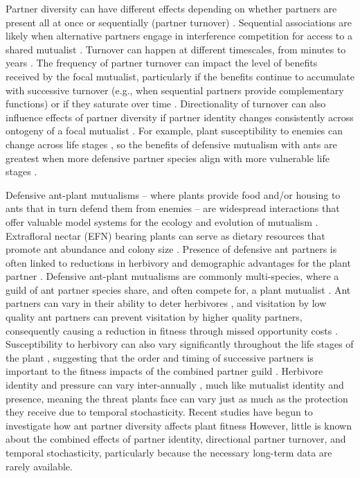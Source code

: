 \documentclass[11pt]{article}
\begin{document}
Partner diversity can have different effects depending on whether partners are present all at once or sequentially (partner turnover) \citep{Djieto-Lordon2005, Ness2006, Bruna2014,Barrett2015,Ushio2020,Dattilo2014}. 
Sequential associations are likely when alternative partners engage in interference competition for access to a shared mutualist \cite{Kiers2003,Batstone2018,Tgaard2015,Wulff2008}. 
Turnover can happen at different timescales, from minutes to years \citep{Oliveira1999,Horvitz1986}. 
The frequency of partner turnover can impact the level of benefits received by the focal mutualist, particularly if the benefits continue to accumulate with successive turnover (e.g., when sequential partners provide complementary functions) or if they saturate over time \citep{Sachs2004,Fiala1994}.
Directionality of turnover can also influence effects of partner diversity if partner identity changes consistently across ontogeny of a focal mutualist \citep{Fonseca2003,Noe1994,Dejean2008}.
For example, plant susceptibility to enemies can change across life stages \citep{Boege2005,Barton2010}, so the benefits of defensive mutualism with ants are greatest when more defensive partner species align with more vulnerable life stages \citep{Djieto-Lordon2005,Dejean2008}.

Defensive ant-plant mutualisms -- where plants provide food and/or housing to ants that in turn defend them from enemies -- are widespread interactions that offer valuable model systems for the ecology and evolution of mutualism \citep{Bronstein1998, Bronstein2006}. 
Extrafloral nectar (EFN) bearing plants can serve as dietary resources that promote ant abundance and colony size \citep{Byk2011, Ness2009, Ness2006, Donald2022}.
Presence of defensive ant partners is often linked to reductions in herbivory  \citep{Trager2010, Rudgers2004} and demographic advantages for the plant partner \citep{Baez2016}.
Defensive ant-plant mutualisms are commonly multi-species, where a guild of ant partner species share, and often compete for, a plant mutualist \citep{Bronstein1998, Beattie1985, Trager2010, Agrawal1998}.
Ant partners can vary in their ability to deter herbivores \citep{Bruna2014}, and visitation by low quality ant partners can prevent visitation by higher quality partners, consequently causing a reduction in fitness through missed opportunity costs \citep{Fraser2001, Frederickson2005}.
Susceptibility to herbivory can also vary significantly throughout the life stages of the plant \citep{Boege2005}, suggesting that the order and timing of successive partners is important to the fitness impacts of the combined partner guild \citep{Barton2010, Boege2005, Fonseca2003}.
Herbivore identity and pressure can vary inter-annually \cite{Wetzel2023}, much like mutualist identity and presence, meaning the threat plants face can vary just as much as the protection they receive due to temporal stochasticity. 
Recent studies have begun to investigate how ant partner diversity affects plant fitness \citep{Palmer2010,Afkhami2014,Fiala1994,Gaume1998,Dattilo2014,Ludka2015}
However, little is known about the combined effects of partner identity, directional partner turnover, and temporal stochasticity, particularly because the necessary long-term data are rarely available. 
	
\end{document}
